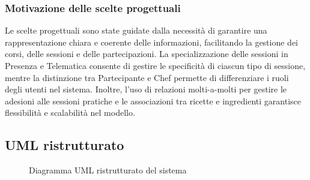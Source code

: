 \subsubsection{Motivazione delle scelte progettuali}
Le scelte progettuali sono state guidate dalla necessità di garantire una rappresentazione chiara e coerente delle informazioni, facilitando la gestione dei corsi, delle sessioni e delle partecipazioni. La specializzazione delle sessioni in Presenza e Telematica consente di gestire le specificità di ciascun tipo di sessione, mentre la distinzione tra Partecipante e Chef permette di differenziare i ruoli degli utenti nel sistema. Inoltre, l'uso di relazioni molti-a-molti per gestire le adesioni alle sessioni pratiche e le associazioni tra ricette e ingredienti garantisce flessibilità e scalabilità nel modello.
\subsection{UML ristrutturato}
\begin{figure}[H]
    \noindent{}
    \caption{Diagramma UML ristrutturato del sistema}
\end{figure}

